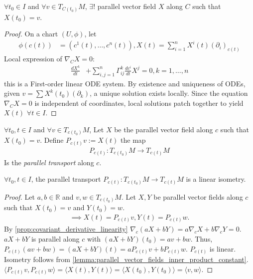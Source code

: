 \begin{proposition}
    $\forall t_0 \in I$ and $\forall v \in T_{C(t_0)}M$, $\exists!$ parallel vector field $X$ along $C$ such that $X(t_0) = v$.
\end{proposition}
\begin{proof}
    On a chart $(U, \phi)$, let
    \[
    \begin{aligned}
        \phi(c(t)) &= (c^1(t), \dots, c^n (t)), X(t) = \sum^n_{i=1} X^i (t)(\partial_i)_{c(t)}
    \end{aligned}
    \]
    Local expression of $\nabla_C X = 0$:
    \[\begin{aligned}
        \frac{dX^k}{dt}& + \sum^n_{i,j=1} \Gamma_{ij}^k \frac{dc^i}{dt} X^j = 0, k =1, \dots, n
    \end{aligned}\]
    this is a First-order linear ODE system.
    By existence and uniqueness of ODEs, given $v = \sum X^k(t_0)(\partial_k)$, a unique solution exists locally.
    Since the equation $\nabla_C X = 0$ is independent of coordinates, local solutions patch together to yield $X(t)$ $\forall t \in I$.
\end{proof}

\begin{definition}
    $\forall t_0, t \in I$ and $\forall v \in T_{c(t_0)}M$, Let $X$ be the parallel vector field along $c$ such that $X(t_0) = v$.
    Define $P_{c(t)}v:= X(t)$ the map 
    \[\begin{aligned}
        P_{c(t)} : T_{c(t_0)}M \to T_{c(t)}M
    \end{aligned}\]
    Is the \emph{parallel transport} along $c$.
\end{definition}
\begin{proposition}
    $\forall t_0,t \in I$, the parallel transport $P_{c(t)}: T_{c(t_0)}M \to T_{c(t)}M$ is a linear isometry.
    \label{prop:parallel_transport_isometry}
\end{proposition}
\begin{proof}
    Let $a,b \in \mathbb{R}$ and $v,w \in T_{c(t_0)}M$. Let $X,Y$ be parallel vector fields along $c$ such that $X(t_0) = v$ and $Y(t_0) = w$. 
    \[
    \begin{aligned}
        \implies X(t) = P_{c(t)}v, Y(t) = P_{c(t)}w.
    \end{aligned}
    \]
    By \autoref{prop:covariant_derivative_linearity} $\nabla_c(aX + bY) = a\nabla_cX + b\nabla_cY = 0$.
    $aX+bY$ is parallel along $c$ with $(aX+bY)(t_0) = av + bw$.
    Thus, $P_{c(t)}(av + bw) = (aX + bY)(t) = aP_{c(t)}v + bP_{c(t)}w$. $P_{c(t)}$ is linear.
    Isometry follows from \autoref{lemma:parallel_vector_fields_inner_product_constant}.
    $\langle P_{c(t)}v, P_{c(t)}w \rangle = \langle X(t), Y(t) \rangle = \langle X(t_0), Y(t_0) \rangle = \langle v, w \rangle$.
\end{proof}

